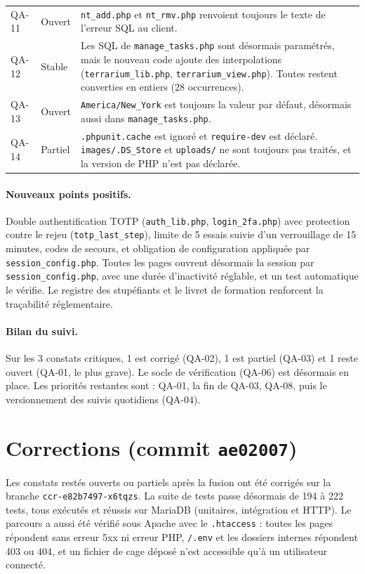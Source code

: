 \documentclass[11pt,a4paper]{article}
\newcommand{\f}[1]{\nolinkurl{#1}}
\begin{document}
\begin{center}
\begin{tabularx}{\textwidth}{@{}lp{2.1cm}X@{}}
QA-11 & \textcolor{crit}{Ouvert} & \f{nt_add.php} et \f{nt_rmv.php} renvoient toujours le texte de l'erreur SQL au client.\\
QA-12 & \textcolor{maj}{Stable} & Les SQL de \f{manage_tasks.php} sont désormais paramétrés, mais le nouveau code ajoute des interpolations (\f{terrarium_lib.php}, \f{terrarium_view.php}). Toutes restent converties en entiers (28 occurrences).\\
QA-13 & \textcolor{crit}{Ouvert} & \f{America/New_York} est toujours la valeur par défaut, désormais aussi dans \f{manage_tasks.php}.\\
QA-14 & \textcolor{maj}{Partiel} & \f{.phpunit.cache} est ignoré et \f{require-dev} est déclaré. \f{images/.DS_Store} et \f{uploads/} ne sont toujours pas traités, et la version de PHP n'est pas déclarée.\\
\bottomrule
\end{tabularx}
\end{center}

\paragraph{Nouveaux points positifs.} Double authentification TOTP
(\f{auth_lib.php}, \f{login_2fa.php}) avec protection contre le rejeu
(\f{totp_last_step}), limite de 5 essais suivie d'un verrouillage de
15 minutes, codes de secours, et obligation de configuration appliquée par
\f{session_config.php}. Toutes les pages ouvrent désormais la session par
\f{session_config.php}, avec une durée d'inactivité réglable, et un test
automatique le vérifie. Le registre des stupéfiants et le livret de formation
renforcent la traçabilité réglementaire.

\paragraph{Bilan du suivi.} Sur les 3 constats critiques, 1 est corrigé
(QA-02), 1 est partiel (QA-03) et 1 reste ouvert (QA-01, le plus grave). Le
socle de vérification (QA-06) est désormais en place. Les priorités restantes
sont : QA-01, la fin de QA-03, QA-08, puis le versionnement des suivis
quotidiens (QA-04).

\section{\texorpdfstring{Corrections (commit \f{ae02007})}{Corrections (commit ae02007)}}

Les constats restés ouverts ou partiels après la fusion ont été corrigés sur
la branche \f{ccr-e82b7497-x6tqzs}. La suite de tests passe désormais de 194 à
222 tests, tous exécutés et réussis sur MariaDB (unitaires, intégration et
HTTP). Le parcours a aussi été vérifié sous Apache avec le \f{.htaccess} :
toutes les pages répondent sans erreur 5xx ni erreur PHP, \f{/.env} et les
dossiers internes répondent 403 ou 404, et un fichier de cage déposé n'est
accessible qu'à un utilisateur connecté.
\end{document}
